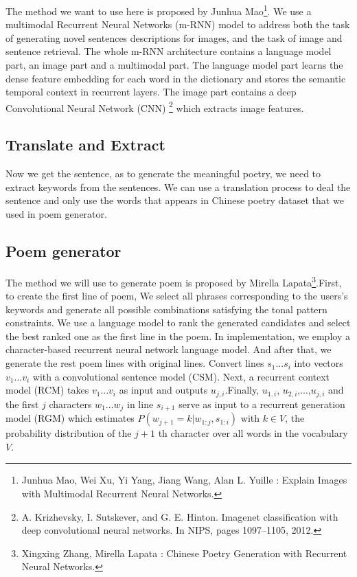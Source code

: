 \documentclass[10pt,twocolumn,letterpaper]{article}
\begin{document}
The method we want to use here is proposed by Junhua Mao\footnote{ Junhua Mao, Wei Xu, Yi Yang, Jiang Wang, Alan L. Yuille : Explain Images with Multimodal Recurrent Neural Networks.}. We use a multimodal Recurrent Neural Networks (m-RNN) model to address both the task of generating novel sentences descriptions for images, and the task of image and sentence retrieval. The whole m-RNN architecture contains a language model part, an image part and a multimodal part. The language model part learns the dense feature embedding for each word in the dictionary and stores the semantic temporal context in recurrent layers. The image part contains a deep Convolutional Neural Network (CNN) \footnote{A. Krizhevsky, I. Sutskever, and G. E. Hinton. Imagenet classification with deep convolutional neural networks. In NIPS, pages 1097–1105, 2012.} which extracts image features.


\subsection{Translate and Extract}
Now we get the sentence, as to generate the meaningful poetry, we need to extract keywords from the sentences. We can use a translation process to deal the sentence and only use the words that appears in Chinese poetry dataset that we used in poem generator.

\subsection{Poem generator}
	The method we will use to generate poem is proposed by Mirella Lapata\footnote{Xingxing Zhang, Mirella Lapata : Chinese Poetry Generation with Recurrent Neural Networks.}.First, to create the first line of poem, We select all phrases corresponding to the users’s keywords and generate all possible combinations satisfying the tonal pattern constraints. We use a language model to rank the generated candidates and select the best ranked one as the first line in the poem. In implementation, we employ a character-based recurrent neural network language model.
	And after that, we generate the rest poem lines with original lines. Convert lines $s_1$...$s_i$ into vectors $v_1$...$v_i$ with a convolutional sentence model (CSM). Next, a recurrent context model (RCM) takes $v_1$...$v_i$ as input and outputs $u_{j,i}$.Finally, $u_{1,i}$, $u_{2,i}$,...,$u_{j,i}$ and the first $j$ characters $w_1$...$w_j$ in line $s_{i+1}$ serve as input to a recurrent generation model (RGM) which estimates $P(w_{j+1} = k | w_{1:j} ,s_{1:i} )$ with $k\in V$, the probability distribution of the $j+1$ th character over all words in the vocabulary $V$.
\end{document}
